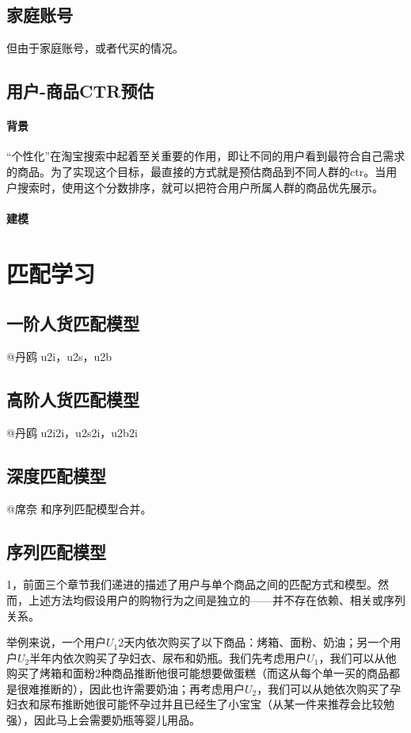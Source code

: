 	\subsection{家庭账号}
	但由于家庭账号，或者代买的情况。
	\subsection{用户-商品CTR预估}
	\paragraph{背景}
	“个性化”在淘宝搜索中起着至关重要的作用，即让不同的用户看到最符合自己需求的商品。为了实现这个目标，最直接的方式就是预估商品到不同人群的ctr。当用户搜索时，使用这个分数排序，就可以把符合用户所属人群的商品优先展示。
	\paragraph{建模}
	

\section{匹配学习}
	
	
\subsection{一阶人货匹配模型} 
	@丹鸥 u2i，u2s，u2b 

\subsection{高阶人货匹配模型} 
	@丹鸥 u2i2i，u2s2i，u2b2i 

\subsection{深度匹配模型} 
    @席奈 和序列匹配模型合并。

\subsection{序列匹配模型} 
1，前面三个章节我们递进的描述了用户与单个商品之间的匹配方式和模型。然而，上述方法均假设用户的购物行为之间是独立的——并不存在依赖、相关或序列关系。

举例来说，一个用户$U_1$2天内依次购买了以下商品：烤箱、面粉、奶油；另一个用户$U_2$半年内依次购买了孕妇衣、尿布和奶瓶。我们先考虑用户$U_1$，我们可以从他购买了烤箱和面粉2种商品推断他很可能想要做蛋糕（而这从每个单一买的商品都是很难推断的），因此也许需要奶油；再考虑用户$U_2$，我们可以从她依次购买了孕妇衣和尿布推断她很可能怀孕过并且已经生了小宝宝（从某一件来推荐会比较勉强），因此马上会需要奶瓶等婴儿用品。

